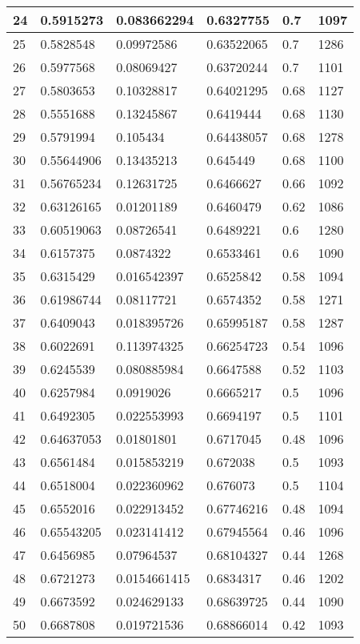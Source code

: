 \begin{longtable}{|l|l|l|l|l|l|}
24 & 0.5915273 & 0.083662294 & 0.6327755 & 0.7 & 1097 \\ \hline 
25 & 0.5828548 & 0.09972586 & 0.63522065 & 0.7 & 1286 \\ \hline 
26 & 0.5977568 & 0.08069427 & 0.63720244 & 0.7 & 1101 \\ \hline 
27 & 0.5803653 & 0.10328817 & 0.64021295 & 0.68 & 1127 \\ \hline 
28 & 0.5551688 & 0.13245867 & 0.6419444 & 0.68 & 1130 \\ \hline 
29 & 0.5791994 & 0.105434 & 0.64438057 & 0.68 & 1278 \\ \hline 
30 & 0.55644906 & 0.13435213 & 0.645449 & 0.68 & 1100 \\ \hline 
31 & 0.56765234 & 0.12631725 & 0.6466627 & 0.66 & 1092 \\ \hline 
32 & 0.63126165 & 0.01201189 & 0.6460479 & 0.62 & 1086 \\ \hline 
33 & 0.60519063 & 0.08726541 & 0.6489221 & 0.6 & 1280 \\ \hline 
34 & 0.6157375 & 0.0874322 & 0.6533461 & 0.6 & 1090 \\ \hline 
35 & 0.6315429 & 0.016542397 & 0.6525842 & 0.58 & 1094 \\ \hline 
36 & 0.61986744 & 0.08117721 & 0.6574352 & 0.58 & 1271 \\ \hline 
37 & 0.6409043 & 0.018395726 & 0.65995187 & 0.58 & 1287 \\ \hline 
38 & 0.6022691 & 0.113974325 & 0.66254723 & 0.54 & 1096 \\ \hline 
39 & 0.6245539 & 0.080885984 & 0.6647588 & 0.52 & 1103 \\ \hline 
40 & 0.6257984 & 0.0919026 & 0.6665217 & 0.5 & 1096 \\ \hline 
41 & 0.6492305 & 0.022553993 & 0.6694197 & 0.5 & 1101 \\ \hline 
42 & 0.64637053 & 0.01801801 & 0.6717045 & 0.48 & 1096 \\ \hline 
43 & 0.6561484 & 0.015853219 & 0.672038 & 0.5 & 1093 \\ \hline 
44 & 0.6518004 & 0.022360962 & 0.676073 & 0.5 & 1104 \\ \hline 
45 & 0.6552016 & 0.022913452 & 0.67746216 & 0.48 & 1094 \\ \hline 
46 & 0.65543205 & 0.023141412 & 0.67945564 & 0.46 & 1096 \\ \hline 
47 & 0.6456985 & 0.07964537 & 0.68104327 & 0.44 & 1268 \\ \hline 
48 & 0.6721273 & 0.0154661415 & 0.6834317 & 0.46 & 1202 \\ \hline 
49 & 0.6673592 & 0.024629133 & 0.68639725 & 0.44 & 1090 \\ \hline 
50 & 0.6687808 & 0.019721536 & 0.68866014 & 0.42 & 1093 \\ \hline 
\end{longtable}